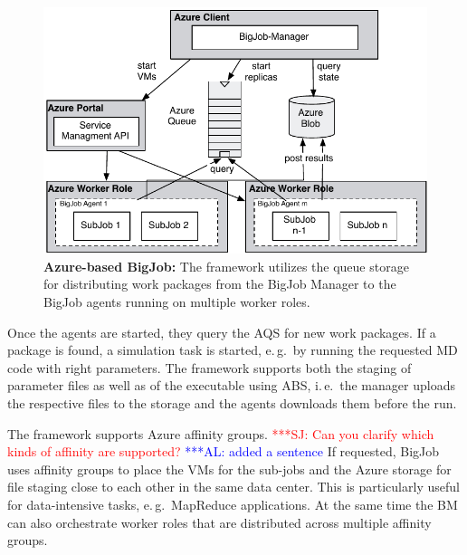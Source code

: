 \documentclass[conference,final]{IEEEtran}
\newcommand{\up}{\vspace*{-1em}}
\newcommand{\alnote}[1]{ {\textcolor{blue} { ***AL: #1 }}}
\newcommand{\jhanote}[1]{ {\textcolor{red} { ***SJ: #1 }}}
\newcommand{\alnote}[1]{}
\newcommand{\jhanote}[1]{}
\begin{document}


\begin{figure}
    \centering
    \includegraphics[width=.4\textwidth]{figures/bigjob_azure}
    \caption{\textbf{Azure-based BigJob:} The framework
      utilizes the queue storage for distributing work
      packages from the BigJob Manager to the
      BigJob agents running on multiple worker roles.}
    \label{fig:figures_bigjob_azure}
    \up\up
\end{figure}

Once the agents are started, they query the AQS for new work packages.
If a package is found, a simulation task is started, e.\,g.\ by
running the requested MD code with right parameters. The framework
supports both the staging of parameter files as well as of the
executable using ABS, i.\,e.\ the manager uploads the respective files
to the storage and the agents downloads them before the run.

The framework supports Azure affinity groups.
\jhanote{Can you clarify which kinds of affinity are supported?} 
\alnote{added a sentence}
If requested,
BigJob uses affinity groups to place the VMs for the sub-jobs and the Azure 
storage for file staging close to each other in the same data center. 
This is particularly useful for
data-intensive tasks, e.\,g.\ MapReduce applications. At the same time
the BM can also orchestrate worker roles that are distributed across
multiple affinity groups.


\end{document}
